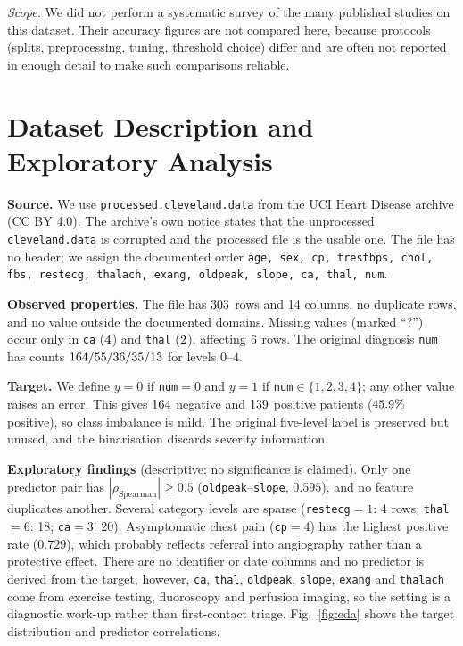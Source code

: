 \documentclass[conference]{IEEEtran}
\begin{document}
\emph{Scope.} We did not perform a systematic survey of the many published studies on this dataset. Their accuracy figures are not compared here, because protocols (splits, preprocessing, tuning, threshold choice) differ and are often not reported in enough detail to make such comparisons reliable.

\section{Dataset Description and Exploratory Analysis}
\textbf{Source.} We use \texttt{processed.cleveland.data} from the UCI Heart Disease archive \cite{uciheart} (CC BY 4.0). The archive's own notice states that the unprocessed \texttt{cleveland.data} is corrupted and the processed file is the usable one. The file has no header; we assign the documented order \texttt{age, sex, cp, trestbps, chol, fbs, restecg, thalach, exang, oldpeak, slope, ca, thal, num}.

\textbf{Observed properties.} The file has $303$ rows and 14 columns, no duplicate rows, and no value outside the documented domains. Missing values (marked ``?'') occur only in \texttt{ca} ($4$) and \texttt{thal} ($2$), affecting $6$ rows. The original diagnosis \texttt{num} has counts $164/55/36/35/13$ for levels $0$--$4$.

\textbf{Target.} We define $y=0$ if \texttt{num}$=0$ and $y=1$ if \texttt{num}$\in\{1,2,3,4\}$; any other value raises an error. This gives $164$ negative and $139$ positive patients ($45.9\%$ positive), so class imbalance is mild. The original five-level label is preserved but unused, and the binarisation discards severity information.

\textbf{Exploratory findings} (descriptive; no significance is claimed). Only one predictor pair has $|\rho_{\text{Spearman}}|\ge 0.5$ (\texttt{oldpeak}--\texttt{slope}, $0.595$), and no feature duplicates another. Several category levels are sparse (\texttt{restecg}$=1$: 4 rows; \texttt{thal}$=6$: 18; \texttt{ca}$=3$: 20). Asymptomatic chest pain (\texttt{cp}$=4$) has the highest positive rate ($0.729$), which probably reflects referral into angiography rather than a protective effect. There are no identifier or date columns and no predictor is derived from the target; however, \texttt{ca}, \texttt{thal}, \texttt{oldpeak}, \texttt{slope}, \texttt{exang} and \texttt{thalach} come from exercise testing, fluoroscopy and perfusion imaging, so the setting is a diagnostic work-up rather than first-contact triage. Fig.~\ref{fig:eda} shows the target distribution and predictor correlations.
\end{document}
